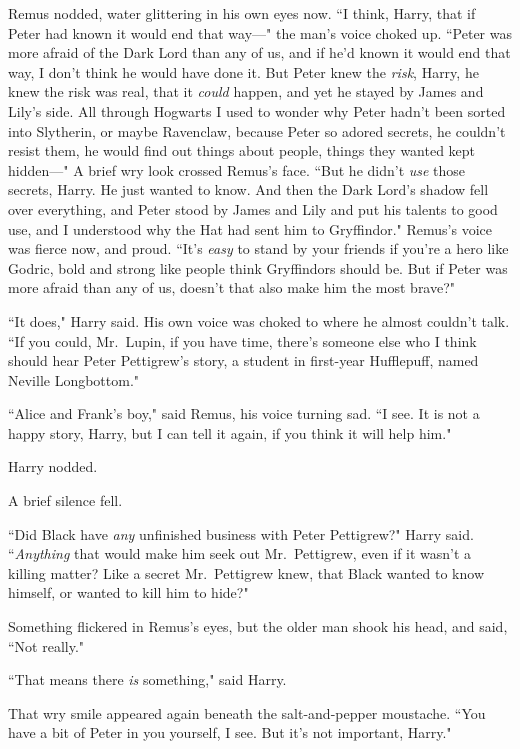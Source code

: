 Remus nodded, water glittering in his own eyes now. ``I think, Harry, that if Peter had known it would end that way—" the man's voice choked up. ``Peter was more afraid of the Dark Lord than any of us, and if he'd known it would end that way, I don't think he would have done it. But Peter knew the \emph{risk}, Harry, he knew the risk was real, that it \emph{could} happen, and yet he stayed by James and Lily's side. All through Hogwarts I used to wonder why Peter hadn't been sorted into Slytherin, or maybe Ravenclaw, because Peter so adored secrets, he couldn't resist them, he would find out things about people, things they wanted kept hidden—" A brief wry look crossed Remus's face. ``But he didn't \emph{use} those secrets, Harry. He just wanted to know. And then the Dark Lord's shadow fell over everything, and Peter stood by James and Lily and put his talents to good use, and I understood why the Hat had sent him to Gryffindor." Remus's voice was fierce now, and proud. ``It's \emph{easy} to stand by your friends if you're a hero like Godric, bold and strong like people think Gryffindors should be. But if Peter was more afraid than any of us, doesn't that also make him the most brave?"

``It does," Harry said. His own voice was choked to where he almost couldn't talk. ``If you could, Mr.~Lupin, if you have time, there's someone else who I think should hear Peter Pettigrew's story, a student in first-year Hufflepuff, named Neville Longbottom."

``Alice and Frank's boy," said Remus, his voice turning sad. ``I see. It is not a happy story, Harry, but I can tell it again, if you think it will help him."

Harry nodded.

A brief silence fell.

``Did Black have \emph{any} unfinished business with Peter Pettigrew?" Harry said. ``\emph{Anything} that would make him seek out Mr.~Pettigrew, even if it wasn't a killing matter? Like a secret Mr.~Pettigrew knew, that Black wanted to know himself, or wanted to kill him to hide?"

Something flickered in Remus's eyes, but the older man shook his head, and said, ``Not really."

``That means there \emph{is} something," said Harry.

That wry smile appeared again beneath the salt-and-pepper moustache. ``You have a bit of Peter in you yourself, I see. But it's not important, Harry."

